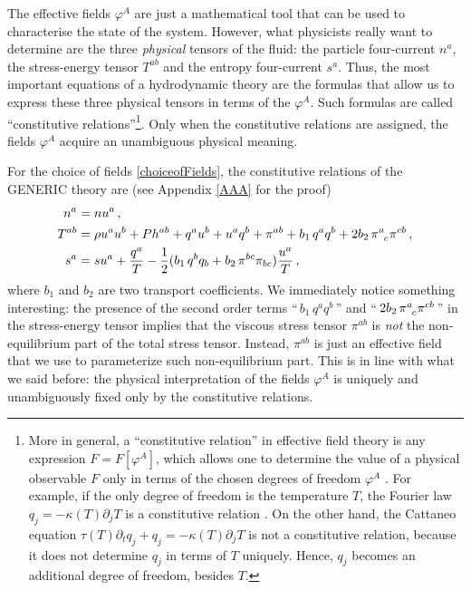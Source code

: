 \documentclass[a4paper, amsfonts, amssymb, amsmath, reprint, showkeys, nofootinbib, twoside, onecolumn, notitlepage]{revtex4-1}
\theoremstyle{definition}
\theoremstyle{theorem}
\begin{document}
The effective fields $\varphi^A$ are just a mathematical tool that can be used to characterise the state of the system. However, what physicists really want to determine are the three \textit{physical} tensors of the fluid: the particle four-current $n^a$, the stress-energy tensor $T^{ab}$ and the entropy four-current $s^a$. Thus, the most important equations of a hydrodynamic theory are the formulas that allow us to express these three physical tensors in terms of the $\varphi^A$. Such formulas are called ``constitutive relations''\footnote{ More in general, a ``constitutive relation'' in effective field theory is any expression $F=F[\varphi^A]$, which allows one to determine the value of a physical observable $F$ only in terms of the chosen degrees of freedom $\varphi^A$ \cite{GavassinoFronntiers2021,Kovtun2019,Romatschke2017}. For example, if the only degree of freedom is the temperature $T$, the Fourier law $q_j=-\kappa(T)\partial_j T$ is a constitutive relation \cite{peliti_book}. On the other hand, the Cattaneo equation $\tau(T)\partial_t q_j +q_j=-\kappa(T)\partial_j T$ \cite{cattaneo1958} is not a constitutive relation, because it does not determine $q_j$ in terms of $T$ uniquely. Hence, $q_j$ becomes an additional degree of freedom, besides $T$.}. Only when the constitutive relations are assigned, the fields $\varphi^A$ acquire an unambiguous physical meaning. 

For the choice of fields \eqref{choiceofFields}, the constitutive relations of the GENERIC theory are (see Appendix \ref{AAA} for the proof)
\begin{equation}\label{ConstitutiveGeneric}
\begin{split}
n^a ={}& n u^a \, , \\
 T^{ab} ={}& \rho u^a u^b +P h^{ab}+q^a u^b+ u^a q^b+\pi^{ab}+ b_1 \, q^a q^b + 2b_2 \, \pi\indices{^a _c}\pi\indices{^c ^b} \, , \\
 s^a ={}& s u^a +\dfrac{q^a}{T} - \dfrac{1}{2}  (b_1 \, q^b q_b +b_2 \, \pi^{bc}\pi_{bc})\dfrac{u^a}{T} \, , \\
\end{split}
\end{equation}
where $b_1$ and $b_2$ are two transport coefficients. We immediately notice something interesting: the presence of the second order terms ``$\, b_1 \, q^a q^b \,$'' and ``$\, 2b_2 \, \pi\indices{^a _c}\pi\indices{^c ^b} \,$'' in the stress-energy tensor implies that the viscous stress tensor $\pi^{ab}$ is \textit{not} the non-equilibrium part of the total stress tensor. Instead, $\pi^{ab}$ is just an effective field that we use to parameterize such non-equilibrium part. This is in line with what we said before: the physical interpretation of the fields $\varphi^A$ is uniquely and unambiguously fixed only by the constitutive relations.
\end{document}
